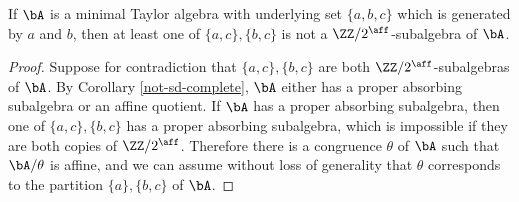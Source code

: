 \begin{prop} If $\bA$ is a minimal Taylor algebra with underlying set $\{a,b,c\}$ which is generated by $a$ and $b$, then at least one of $\{a,c\}, \{b,c\}$ is not a $\ZZ/2^{\aff}$-subalgebra of $\bA$.
\end{prop}
\begin{proof} Suppose for contradiction that $\{a,c\},\{b,c\}$ are both $\ZZ/2^{\aff}$-subalgebras of $\bA$. By Corollary \ref{not-sd-complete}, $\bA$ either has a proper absorbing subalgebra or an affine quotient. If $\bA$ has a proper absorbing subalgebra, then one of $\{a,c\}, \{b,c\}$ has a proper absorbing subalgebra, which is impossible if they are both copies of $\ZZ/2^{\aff}$. Therefore there is a congruence $\theta$ of $\bA$ such that $\bA/\theta$ is affine, and we can assume without loss of generality that $\theta$ corresponds to the partition $\{a\}, \{b,c\}$ of $\bA$.


\end{proof}
